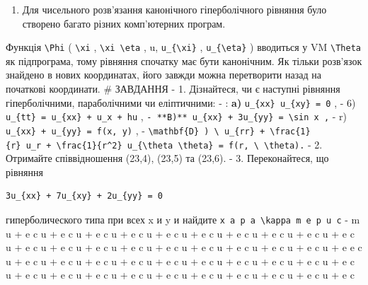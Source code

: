 \documentclass[
  ukrainian,
]{article}
\providecommand{\tightlist}{%
  \setlength{\itemsep}{0pt}\setlength{\parskip}{0pt}}
\begin{document}
\begin{enumerate}
\def\labelenumi{\alph{enumi})}
\setcounter{enumi}{2}
\tightlist
\item
  Для чисельного розв'язання канонічного гіперболічного рівняння було
  створено багато різних комп'ютерних програм.
\end{enumerate}

Функція \texttt{\textbackslash{}Phi} ( \texttt{\textbackslash{}xi} ,
\texttt{\textbackslash{}xi\ \textbackslash{}eta} , u,
\texttt{u\_\{\textbackslash{}xi\}} , \texttt{u\_\{\textbackslash{}eta\}}
) вводиться у VM \texttt{\textbackslash{}Theta} як підпрограма, тому
рівняння спочатку має бути канонічним. Як тільки розв'язок знайдено в
нових координатах, його завжди можна перетворити назад на початкові
координати. \# ЗАВДАННЯ - 1. Дізнайтеся, чи є наступні рівняння
гіперболічними, параболічними чи еліптичними: - : \textbf{a)}
\texttt{u\_\{xx\}\ u\_\{xy\}\ =\ 0} , - 6)
\texttt{u\_\{tt\}\ =\ u\_\{xx\}\ +\ u\_x\ +\ hu} ,
\texttt{-\ **B)**\ \textquotesingle{}u\_\{xx\}\ +\ 3u\_\{yy\}\ =\ \textbackslash{}sin\ x\textquotesingle{}\ ,}
- r) \texttt{u\_\{xx\}\ +\ u\_\{yy\}\ =\ f(x,\ y)} , -
\texttt{\textbackslash{}mathbf\{D\}\ )\ \textbackslash{}\ u\_\{rr\}\ +\ \textbackslash{}frac\{1\}\{r\}\ u\_r\ +\ \textbackslash{}frac\{1\}\{r\^{}2\}\ u\_\{\textbackslash{}theta\ \textbackslash{}theta\}\ =\ f(r,\ \textbackslash{}\ \textbackslash{}theta).}
- 2. Отримайте співвідношення (23,4), (23,5) та (23,6). - 3.
Переконайтеся, що рівняння

\begin{verbatim}
3u_{xx} + 7u_{xy} + 2u_{yy} = 0
\end{verbatim}

гиперболического типа при всех x и y и найдите
\texttt{x\ a\ p\ a\ \textbackslash{}kappa\ m\ e\ p\ u\ c} - m u + e c
\kappa u + e c \kappa u + e c \kappa u + e c \kappa u + e c \kappa u + e
c \kappa u + e c \kappa u + e c \kappa u + e c \kappa u + e c \kappa u +
e c \kappa u + e c \kappa u + e c \kappa u + e c \kappa u + e c \kappa u
+ e c \kappa u + e c \kappa u + e c \kappa u + e c \kappa u + e e c
\kappa u + e c \kappa u + e c \kappa u + e c \kappa u + e c \kappa u + e
c \kappa u + e c \kappa u + e c \kappa u + e c \kappa u + e c \kappa u +
e c \kappa u + e c \kappa u + e c \kappa u + e c \kappa u + e c \kappa u
+ e c \kappa u + e c \kappa u + e c \kappa u + e c \kappa u + e c \kap u
+ e c \kap
\end{document}
